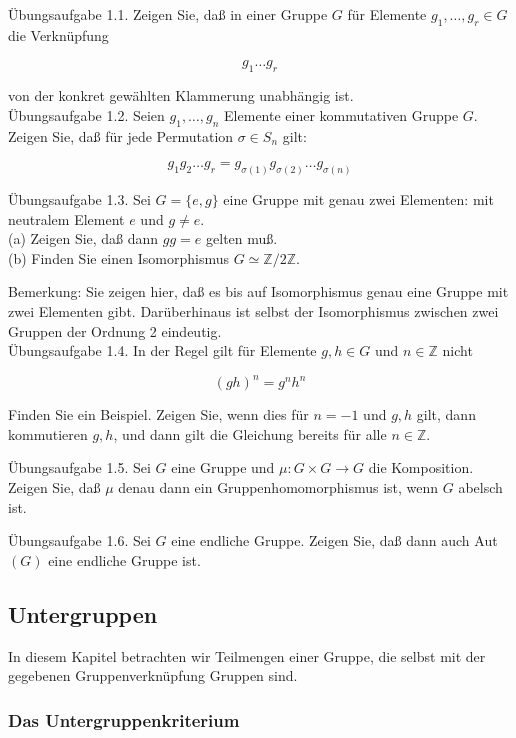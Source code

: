 \documentclass[10pt, letterpaper]{article}
\begin{document}
Übungsaufgabe 1.1. Zeigen Sie, daß in einer Gruppe $G$ für Elemente $g_{1}, \ldots, g_{r} \in G$ die Verknüpfung

$$
g_{1} \ldots g_{r}
$$

von der konkret gewählten Klammerung unabhängig ist.\\
Übungsaufgabe 1.2. Seien $g_{1}, \ldots, g_{n}$ Elemente einer kommutativen Gruppe $G$. Zeigen Sie, daß für jede Permutation $\sigma \in S_{n}$ gilt:

$$
g_{1} g_{2} \ldots g_{r}=g_{\sigma(1)} g_{\sigma(2)} \ldots g_{\sigma(n)}
$$

Übungsaufgabe 1.3. Sei $G=\{e, g\}$ eine Gruppe mit genau zwei Elementen: mit neutralem Element $e$ und $g \neq e$.\\
(a) Zeigen Sie, daß dann $g g=e$ gelten muß.\\
(b) Finden Sie einen Isomorphismus $G \simeq \mathbb{Z} / 2 \mathbb{Z}$.

Bemerkung: Sie zeigen hier, daß es bis auf Isomorphismus genau eine Gruppe mit zwei Elementen gibt. Darüberhinaus ist selbst der Isomorphismus zwischen zwei Gruppen der Ordnung 2 eindeutig.\\
Übungsaufgabe 1.4. In der Regel gilt für Elemente $g, h \in G$ und $n \in \mathbb{Z}$ nicht

$$
(g h)^{n}=g^{n} h^{n}
$$

Finden Sie ein Beispiel. Zeigen Sie, wenn dies für $n=-1$ und $g, h$ gilt, dann kommutieren $g, h$, und dann gilt die Gleichung bereits für alle $n \in \mathbb{Z}$.

Übungsaufgabe 1.5. Sei $G$ eine Gruppe und $\mu: G \times G \rightarrow G$ die Komposition. Zeigen Sie, daß $\mu$ denau dann ein Gruppenhomomorphismus ist, wenn $G$ abelsch ist.

Übungsaufgabe 1.6. Sei $G$ eine endliche Gruppe. Zeigen Sie, daß dann auch Aut $(G)$ eine endliche Gruppe ist.




\pagebreak


\subsection{Untergruppen}


In diesem Kapitel betrachten wir Teilmengen einer Gruppe, die selbst mit der gegebenen Gruppenverknüpfung Gruppen sind.\\


\subsubsection{Das Untergruppenkriterium} 
\end{document}
